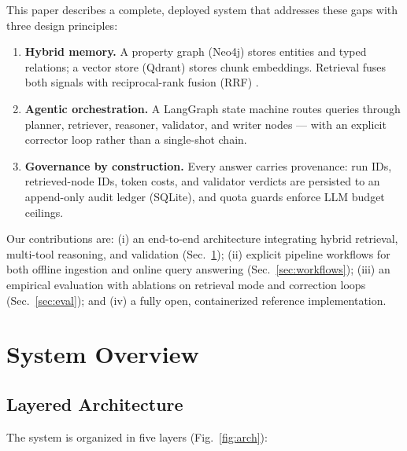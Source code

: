 \documentclass[conference]{IEEEtran}
\begin{document}
This paper describes a complete, deployed system that addresses these gaps with three design principles:

\begin{enumerate}
\item \textbf{Hybrid memory.} A property graph (Neo4j) stores entities and typed relations; a vector store (Qdrant) stores chunk embeddings. Retrieval fuses both signals with reciprocal-rank fusion (RRF) \cite{cormack2009rrf}.
\item \textbf{Agentic orchestration.} A LangGraph \cite{langgraph} state machine routes queries through planner, retriever, reasoner, validator, and writer nodes --- with an explicit corrector loop rather than a single-shot chain.
\item \textbf{Governance by construction.} Every answer carries provenance: run IDs, retrieved-node IDs, token costs, and validator verdicts are persisted to an append-only audit ledger (SQLite), and quota guards enforce LLM budget ceilings.
\end{enumerate}

Our contributions are: (i) an end-to-end architecture integrating hybrid retrieval, multi-tool reasoning, and validation (Sec.~\ref{sec:arch}); (ii) explicit pipeline workflows for both offline ingestion and online query answering (Sec.~\ref{sec:workflows}); (iii) an empirical evaluation with ablations on retrieval mode and correction loops (Sec.~\ref{sec:eval}); and (iv) a fully open, containerized reference implementation.

\section{System Overview}\label{sec:arch}

\subsection{Layered Architecture}
The system is organized in five layers (Fig.~\ref{fig:arch}):
\end{document}

